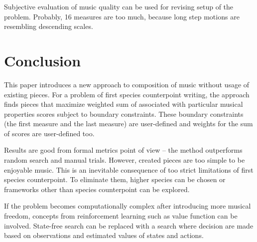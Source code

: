 \documentclass{article}
\begin{document}
Subjective evaluation of music quality can be used for revising setup of the problem. Probably, 16 measures are too much, because long step motions are resembling descending scales.


\section{Conclusion}
\label{sec:conclusion}

This paper introduces a new approach to composition of music without usage of existing pieces. For a problem of first species counterpoint writing, the approach finds pieces that maximize weighted sum of associated with particular musical properties scores subject to boundary constraints. These boundary constraints (the first measure and the last measure) are user-defined and weights for the sum of scores are user-defined too.

Results are good from formal metrics point of view -- the method outperforms random search and manual trials. However, created pieces are too simple to be enjoyable music. This is an inevitable consequence of too strict limitations of first species counterpoint. To eliminate them, higher species can be chosen or frameworks other than species counterpoint can be explored.

If the problem becomes computationally complex after introducing more musical freedom, concepts from reinforcement learning such as value function can be involved. State-free search can be replaced with a search where decision are made based on observations and estimated values of states and actions. 


  

\end{document}
